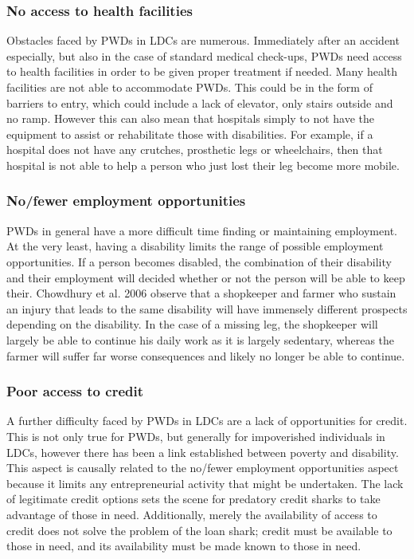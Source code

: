 \documentclass[a4paper]{article}
\begin{document}
\subsubsection{No access to health facilities}

Obstacles faced by PWDs in LDCs are numerous. Immediately after an accident
especially, but also in the case of standard medical check-ups, PWDs need
access to health facilities in order to be given proper treatment if needed.
Many health facilities are not able to accommodate PWDs. This could be in the
form of barriers to entry, which could include a lack of elevator, only stairs
outside and no ramp. However this can also mean that hospitals simply to not
have the equipment to assist or rehabilitate those with disabilities. For
example, if a hospital does not have any crutches, prosthetic legs or
wheelchairs, then that hospital is not able to help a person who just lost
their leg become more mobile. 


\subsubsection{No/fewer employment opportunities}

PWDs in general have a more difficult time finding or maintaining employment.
At the very least, having a disability limits the range of possible employment
opportunities. If a person becomes disabled, the combination of their
disability and their employment will decided whether or not the person will be
able to keep their. Chowdhury et al. 2006 observe that a shopkeeper and farmer
who sustain an injury that leads to the same disability will have immensely
different prospects depending on the disability. In the case of a missing leg,
the shopkeeper will largely be able to continue his daily work as it is
largely sedentary, whereas the farmer will suffer far worse consequences and
likely no longer be able to continue.

\subsubsection{Poor access to credit}

A further difficulty faced by PWDs in LDCs are a lack of opportunities for
credit. This is not only true for PWDs, but generally for impoverished
individuals in LDCs, however there has been a link established between poverty
and disability. This aspect is causally related to the no/fewer employment
opportunities aspect because it limits any entrepreneurial activity that might
be undertaken. The lack of legitimate credit options sets the scene for
predatory credit sharks to take advantage of those in need. Additionally,
merely the availability of access to credit does not solve the problem of the
loan shark; credit must be available to those in need, and its availability
must be made known to those in need.
\end{document}

